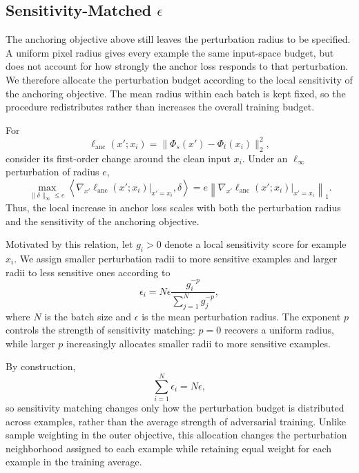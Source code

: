 \subsection{Sensitivity-Matched \(\epsilon\)}
\label{sec:angeps}

The anchoring objective above still leaves the perturbation radius to be
specified. A uniform pixel radius gives every example the same input-space
budget, but does not account for how strongly the anchor loss responds to
that perturbation. We therefore allocate the perturbation budget according
to the local sensitivity of the anchoring objective. The mean radius within
each batch is kept fixed, so the procedure redistributes rather than
increases the overall training budget.

For
\[
\ell_{\mathrm{anc}}(x';x_i)
=
\lVert
\Phi_s(x')-\Phi_t(x_i)
\rVert_2^2,
\]
consider its first-order change around the clean input \(x_i\). Under an
\(\ell_\infty\) perturbation of radius \(e\),
\begin{equation}
\max_{\lVert\delta\rVert_\infty\le e}
\left\langle
\nabla_{x'}
\ell_{\mathrm{anc}}(x';x_i)\big|_{x'=x_i},
\delta
\right\rangle
=
e
\left\lVert
\nabla_{x'}
\ell_{\mathrm{anc}}(x';x_i)\big|_{x'=x_i}
\right\rVert_1.
\label{eqn:firstorder}
\end{equation}
Thus, the local increase in anchor loss scales with both the perturbation
radius and the sensitivity of the anchoring objective.

Motivated by this relation, let \(g_i>0\) denote a local sensitivity score
for example \(x_i\). We assign smaller perturbation radii to more sensitive
examples and larger radii to less sensitive ones according to
\begin{equation}
\epsilon_i
=
N\epsilon
\frac{g_i^{-p}}
{\sum_{j=1}^{N} g_j^{-p}},
\label{eqn:angeps_ideal}
\end{equation}
where \(N\) is the batch size and \(\epsilon\) is the mean perturbation
radius. The exponent \(p\) controls the strength of sensitivity matching:
\(p=0\) recovers a uniform radius, while larger \(p\) increasingly allocates
smaller radii to more sensitive examples.

By construction,
\[
\sum_{i=1}^{N}\epsilon_i=N\epsilon,
\]
so sensitivity matching changes only how the perturbation budget is
distributed across examples, rather than the average strength of adversarial
training. Unlike sample weighting in the outer objective, this allocation
changes the perturbation neighborhood assigned to each example while
retaining equal weight for each example in the training average.


